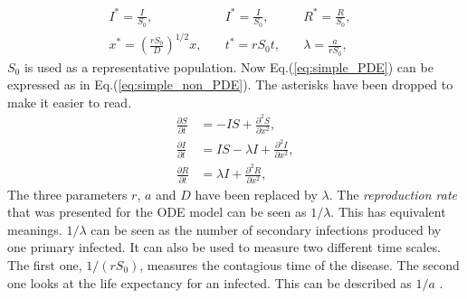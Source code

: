 \documentclass[%
twoside,                 %
final,                   %
chapterprefix=true,      %
open=right               %
10pt]{book}
\begin{document}
\begin{equation} \label{eq:constants_nondimensional}
	\begin{aligned}
	I^* =\frac{I}{S_0},&\quad I^* = \frac{I}{S_0},&\quad R^*= \frac{R}{S_0},&\\
	x^* =\left(\frac{rS_0}{D}\right)^{1/2}x,&\quad t^*=rS_0t,&\quad \lambda =\frac{a}{rS_0},&
	\end{aligned}
\end{equation}
$S_0$ is used as a representative population. Now Eq.(\ref{eq:simple_PDE}) can be expressed as in Eq.(\ref{eq:simple_non_PDE}). The asterisks have been dropped to make it easier to read.
\begin{equation} \label{eq:simple_non_PDE}
	\begin{aligned}
	\frac{\partial S}{\partial t} &= -IS + \frac{\partial^2 S}{\partial x^2},\\
	\frac{\partial I}{\partial t} &= IS- \lambda I + \frac{\partial^2 I}{\partial x^2},\\
	\frac{\partial R}{\partial t} &= \lambda I + \frac{\partial^2 R}{\partial x^2},
	\end{aligned}
\end{equation}
The three parameters $r$, $a$ and $D$ have been replaced by $\lambda$. The \emph{reproduction rate} that was presented for the ODE model can be seen as $1/\lambda $. This has equivalent meanings. $1/\lambda$ can be seen as the number of secondary infections produced by one primary infected. It can also be used to measure two different time scales. The first one, $1/(rS_0)$, measures the contagious time of the disease. The second one looks at the life expectancy for an infected. This can be described as $1/a$ \cite{murray2003mathematical}. 
\end{document}
